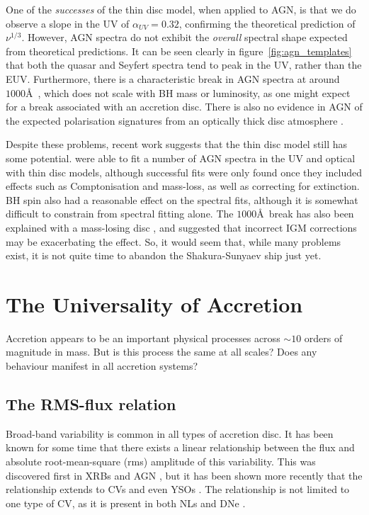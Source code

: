 One of the {\em successes} of the thin disc model, when applied to AGN,
is that we do observe a slope in the UV of $\alpha_{UV} = 0.32$, confirming
the theoretical prediction of $\nu^{1/3}$. 
However, AGN spectra do not exhibit the {\em overall} spectral shape expected
from theoretical predictions. It can be seen clearly in figure~\ref{fig:agn_templates}
that both the quasar and Seyfert spectra tend to peak in the UV, rather than
the EUV. Furthermore, there is a characteristic break in AGN spectra at
around $1000$\AA\ \citep{lusso2015}, which does not scale with BH mass or luminosity,
as one might expect for a break associated with an accretion disc. 
There is also no evidence in AGN of the expected polarisation signatures from an 
optically thick disc atmosphere \citep{stockman1979,antonucci1988,antonucci1996}. 

Despite these problems, recent work suggests that the thin disc model 
still has some potential. \cite{capellupo2015} were able to fit a number of
AGN spectra in the UV and optical with thin disc models, although successful fits
were only found once they included effects such as Comptonisation and mass-loss,
as well as correcting for extinction. BH spin also had a reasonable effect on the 
spectral fits, although it is somewhat difficult to constrain from spectral fitting alone.
The $1000$\AA\ break has also been explained with a mass-losing disc \citep{laordavis2014},
and \cite{lusso2015} suggested that incorrect IGM corrections may be exacerbating the effect.
So, it would seem that, while many problems exist, it is not quite time to 
abandon the Shakura-Sunyaev ship just yet.

\section{The Universality of Accretion}

Accretion appears to be an important physical processes across $\sim10$ orders
of magnitude in mass. But is this process the same at all scales? Does any 
behaviour manifest in all accretion systems? 

\subsection{The RMS-flux relation}

Broad-band variability is common in all types of accretion disc. It has been
known for some time that there exists a linear relationship
between the flux and absolute root-mean-square (rms) amplitude
of this variability. This was discovered first in XRBs and AGN 
\citep{uttley2001, uttley2005, heil2012}, but it has been shown
more recently that the relationship extends to CVs and even YSOs 
\citep{scaringi2012,scaringi2015a}. The relationship is not limited
to one type of CV, as it is present in both NLs and DNe \citep{vandesande2015}.
 
